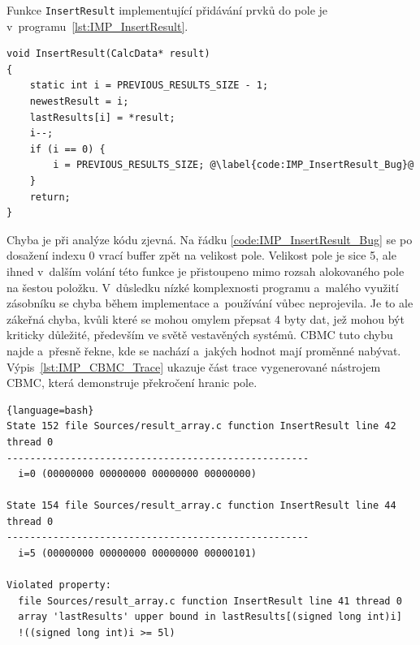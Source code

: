 \documentclass[a4paper, 11pt]{article}
\begin{document}
Funkce \texttt{InsertResult} implementující přidávání prvků do pole je v~programu~\ref{lst:IMP_InsertResult}.
\begin{listing}[h]
    \caption{Funkce \texttt{InsertResult} implementující vkládání nově vypočtených výsledků do cyklického pole.}
    \label{lst:IMP_InsertResult}
    \begin{verbatim}
void InsertResult(CalcData* result)
{
    static int i = PREVIOUS_RESULTS_SIZE - 1;
    newestResult = i;
    lastResults[i] = *result;
    i--;
    if (i == 0) {
        i = PREVIOUS_RESULTS_SIZE; @\label{code:IMP_InsertResult_Bug}@
    }
    return;
}
    \end{verbatim}
\end{listing}
Chyba je při analýze kódu zjevná.
Na řádku \ref{code:IMP_InsertResult_Bug} se po dosažení indexu 0 vrací buffer zpět na velikost pole.
Velikost pole je sice 5, ale ihned v~dalším volání této funkce je přistoupeno mimo rozsah alokovaného pole na šestou položku.
V~důsledku nízké komplexnosti programu a~malého využití zásobníku se chyba během implementace a~používání vůbec neprojevila.
Je to ale zákeřná chyba, kvůli které se mohou omylem přepsat 4 byty dat, jež mohou být kriticky důležité, především ve světě vestavěných systémů.
CBMC tuto chybu najde a~přesně řekne, kde se nachází a~jakých hodnot mají proměnné nabývat.
Výpis~\ref{lst:IMP_CBMC_Trace} ukazuje část trace vygenerované nástrojem CBMC, která demonstruje překročení hranic pole.
\begin{trace}[h]
    \caption{Výpis nástroje CBMC prokazující zápis mimo pole.}
    \label{lst:IMP_CBMC_Trace}
    \begin{lstlisting}{language=bash}
State 152 file Sources/result_array.c function InsertResult line 42 thread 0
----------------------------------------------------
  i=0 (00000000 00000000 00000000 00000000)

State 154 file Sources/result_array.c function InsertResult line 44 thread 0
----------------------------------------------------
  i=5 (00000000 00000000 00000000 00000101)

Violated property:
  file Sources/result_array.c function InsertResult line 41 thread 0
  array 'lastResults' upper bound in lastResults[(signed long int)i]    
  !((signed long int)i >= 5l)
    \end{lstlisting}
\end{trace}
\end{document}
